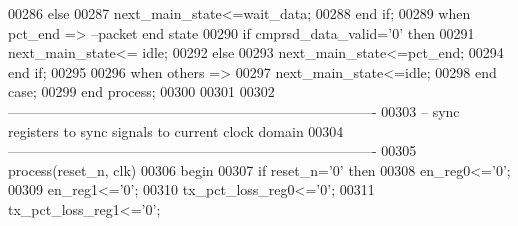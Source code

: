 \begin{DoxyCode}
00286             \textcolor{keywordflow}{else} 
00287                 \textcolor{vhdlchar}{next_main_state}\textcolor{vhdlchar}{<=}\textcolor{vhdlchar}{wait\_data};
00288             \textcolor{keywordflow}{end} \textcolor{keywordflow}{if};
00289         \textcolor{keywordflow}{when} \textcolor{vhdlchar}{pct\_end} \textcolor{vhdlchar}{=}\textcolor{vhdlchar}{>}\textcolor{keyword}{         --packet end state}
00290             \textcolor{keywordflow}{if} \textcolor{vhdlchar}{cmprsd_data_valid}\textcolor{vhdlchar}{=}\textcolor{vhdlchar}{'}\textcolor{vhdllogic}{}\textcolor{vhdllogic}{0}\textcolor{vhdlchar}{'} \textcolor{keywordflow}{then} 
00291                 \textcolor{vhdlchar}{next_main_state}\textcolor{vhdlchar}{<=} \textcolor{vhdlchar}{idle};
00292             \textcolor{keywordflow}{else} 
00293                 \textcolor{vhdlchar}{next_main_state}\textcolor{vhdlchar}{<=}\textcolor{vhdlchar}{pct\_end};
00294             \textcolor{keywordflow}{end} \textcolor{keywordflow}{if};
00295           
00296         \textcolor{keywordflow}{when} \textcolor{keywordflow}{others} \textcolor{vhdlchar}{=}\textcolor{vhdlchar}{>}
00297             \textcolor{vhdlchar}{next_main_state}\textcolor{vhdlchar}{<=}\textcolor{vhdlchar}{idle};
00298     \textcolor{keywordflow}{end} \textcolor{keywordflow}{case};
00299 \textcolor{keywordflow}{end} \textcolor{keywordflow}{process};
00300 
00301 
00302 \textcolor{keyword}{-------------------------------------------------------------------------------}
00303 \textcolor{keyword}{-- sync registers to sync signals to current clock domain}
00304 \textcolor{keyword}{-------------------------------------------------------------------------------}
00305   \textcolor{keywordflow}{process}(reset_n, clk)
00306 \textcolor{vhdlkeyword}{    begin}
00307       \textcolor{keywordflow}{if} \textcolor{vhdlchar}{reset_n}\textcolor{vhdlchar}{=}\textcolor{vhdlchar}{'}\textcolor{vhdllogic}{}\textcolor{vhdllogic}{0}\textcolor{vhdlchar}{'} \textcolor{keywordflow}{then}
00308             \textcolor{vhdlchar}{en_reg0}\textcolor{vhdlchar}{<=}\textcolor{vhdlchar}{'}\textcolor{vhdllogic}{}\textcolor{vhdllogic}{0}\textcolor{vhdlchar}{'};
00309             \textcolor{vhdlchar}{en_reg1}\textcolor{vhdlchar}{<=}\textcolor{vhdlchar}{'}\textcolor{vhdllogic}{}\textcolor{vhdllogic}{0}\textcolor{vhdlchar}{'};
00310             \textcolor{vhdlchar}{tx_pct_loss_reg0}\textcolor{vhdlchar}{<=}\textcolor{vhdlchar}{'}\textcolor{vhdllogic}{}\textcolor{vhdllogic}{0}\textcolor{vhdlchar}{'};
00311             \textcolor{vhdlchar}{tx_pct_loss_reg1}\textcolor{vhdlchar}{<=}\textcolor{vhdlchar}{'}\textcolor{vhdllogic}{}\textcolor{vhdllogic}{0}\textcolor{vhdlchar}{'};

\end{DoxyCode}
